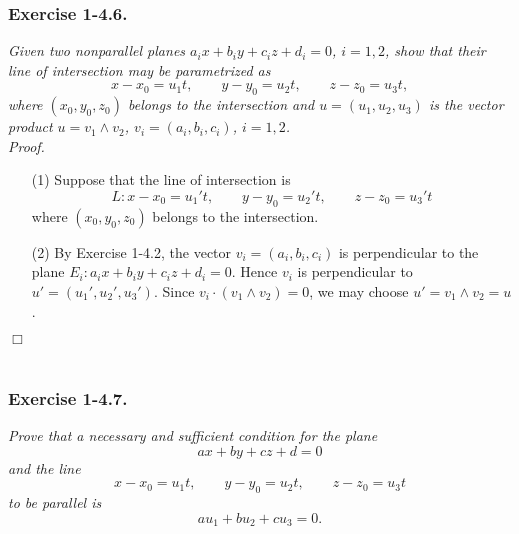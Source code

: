 \documentclass{article}
\begin{document}



\subsubsection*{Exercise 1-4.6.}
\emph{Given two nonparallel planes $a_i x + b_i y + c_i z + d_i = 0$, $i = 1, 2$,
show that their line of intersection may be parametrized as
\[
  x-x_0 = u_1 t, \qquad y-y_0 = u_2 t, \qquad z-z_0 = u_3 t,
\]
where $(x_0, y_0, z_0)$ belongs to the intersection and
$u = (u_1, u_2, u_3)$ is the vector product $u = v_1 \wedge v_2$,
$v_i = (a_i, b_i, c_i)$, $i = 1, 2$.} \\



\emph{Proof.}
\begin{enumerate}
\item[(1)]
  Suppose that the line of intersection is
  \[
    L: x-x_0 = u_1' t, \qquad y-y_0 = u_2' t, \qquad z-z_0 = u_3' t
  \]
  where $(x_0, y_0, z_0)$ belongs to the intersection.

\item[(2)]
  By Exercise 1-4.2,
  the vector $v_i = (a_i,b_i,c_i)$ is perpendicular to
  the plane $E_i: a_i x + b_i y + c_i z + d_i = 0$.
  Hence $v_i$ is perpendicular to $u' = (u_1', u_2', u_3')$.
  Since $v_i \cdot (v_1 \wedge v_2) = 0$, we may choose $u' = v_1 \wedge v_2 = u$.
\end{enumerate}
$\Box$ \\\\






\subsubsection*{Exercise 1-4.7.}
\emph{Prove that a necessary and sufficient condition for the plane
\[
  ax+by+cz+d = 0
\]
and the line
\[
  x-x_0 = u_1 t, \qquad y-y_0 = u_2 t, \qquad z-z_0 = u_3 t
\]
to be parallel is}
\[
  au_1+bu_2+cu_3 = 0.
\]
\end{document}
